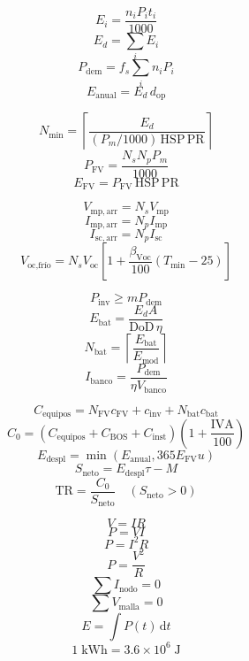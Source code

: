 \[
E_i=\frac{n_iP_it_i}{1000}
\]
\[
E_d=\sum_i E_i
\]
\[
P_{\mathrm{dem}}=f_s\sum_i n_iP_i
\]
\[
E_{\mathrm{anual}}=E_d\,d_{\mathrm{op}}
\]

\[
N_{\min}=\left\lceil\frac{E_d}{(P_m/1000)\,\mathrm{HSP}\,\mathrm{PR}}\right\rceil
\]
\[
P_{\mathrm{FV}}=\frac{N_sN_pP_m}{1000}
\]
\[
E_{\mathrm{FV}}=P_{\mathrm{FV}}\,\mathrm{HSP}\,\mathrm{PR}
\]

\[
V_{\mathrm{mp,arr}}=N_sV_{\mathrm{mp}}
\]
\[
I_{\mathrm{mp,arr}}=N_pI_{\mathrm{mp}}
\]
\[
I_{\mathrm{sc,arr}}=N_pI_{\mathrm{sc}}
\]
\[
V_{\text{oc,frío}}=N_sV_{\mathrm{oc}}\left[1+\frac{\beta_{\mathrm{Voc}}}{100}(T_{\min}-25)\right]
\]

\[
P_{\mathrm{inv}}\geq mP_{\mathrm{dem}}
\]
\[
E_{\mathrm{bat}}=\frac{E_dA}{\mathrm{DoD}\,\eta}
\]
\[
N_{\mathrm{bat}}=\left\lceil\frac{E_{\mathrm{bat}}}{E_{\mathrm{mod}}}\right\rceil
\]
\[
I_{\mathrm{banco}}=\frac{P_{\mathrm{dem}}}{\eta V_{\mathrm{banco}}}
\]

\[
C_{\mathrm{equipos}}=N_{\mathrm{FV}}c_{\mathrm{FV}}+c_{\mathrm{inv}}+N_{\mathrm{bat}}c_{\mathrm{bat}}
\]
\[
C_0=(C_{\mathrm{equipos}}+C_{\mathrm{BOS}}+C_{\mathrm{inst}})\left(1+\frac{\mathrm{IVA}}{100}\right)
\]
\[
E_{\mathrm{despl}}=\min\left(E_{\mathrm{anual}},365E_{\mathrm{FV}}u\right)
\]
\[
S_{\mathrm{neto}}=E_{\mathrm{despl}}\tau-M
\]
\[
\mathrm{TR}=\frac{C_0}{S_{\mathrm{neto}}}\quad(S_{\mathrm{neto}}>0)
\]

\[
V=IR
\]
\[
P=VI
\]
\[
P=I^2R
\]
\[
P=\frac{V^2}{R}
\]
\[
\sum I_{\mathrm{nodo}}=0
\]
\[
\sum V_{\mathrm{malla}}=0
\]
\[
E=\int P(t)\,\mathrm{d}t
\]
\[
1\;\mathrm{kWh}=3.6\times10^6\;\mathrm{J}
\]